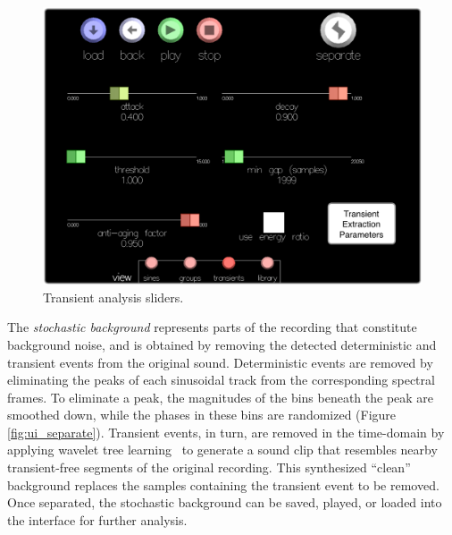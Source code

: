 \documentclass[10pt,letterpaper]{article}
\begin{document}
\begin{figure}[h]
  \begin{center}
    \includegraphics[width=.95\columnwidth]{ui_sliders3.pdf}
    \caption{Transient analysis sliders.} 
    \label{fig:ui_sliders_tran}
  \end{center}
\end{figure}

The \textit{stochastic background} represents parts of the recording that
constitute background noise, and is obtained by removing the detected
deterministic and transient events from the original sound. Deterministic
events are removed by eliminating the peaks of each sinusoidal track from
the corresponding spectral frames. To eliminate a peak, the magnitudes of
the bins beneath the peak are smoothed down, while the phases in these bins
are randomized (Figure \ref{fig:ui_separate}). Transient events, in turn, are removed in the time-domain by applying wavelet tree learning~ to generate a sound clip
that resembles nearby transient-free segments of the original recording.
This synthesized ``clean'' background replaces the samples containing the
transient event to be removed. Once separated, the stochastic background can be saved, played, or loaded into the interface for further analysis. 
\end{document}
